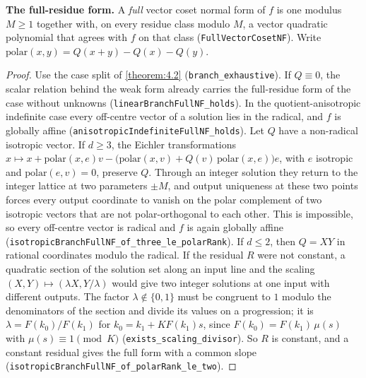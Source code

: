 \textbf{The full-residue form.} A \emph{full} vector coset normal form of $f$ is one modulus $M ≥ 1$ together with, on every residue class modulo $M$, a vector quadratic polynomial that agrees with $f$ on that class (\texttt{FullVectorCosetNF}). Write $\mathrm{polar}(x, y) = Q(x + y) - Q(x) - Q(y)$.


\begin{proof}
Use the case split of \cref{theorem:4.2} (\texttt{branch\_exhaustive}). If $Q ≡ 0$, the scalar relation behind the weak form already carries the full-residue form of the case without unknowns (\texttt{linearBranchFullNF\_holds}). In the quotient-anisotropic indefinite case every off-centre vector of a solution lies in the radical, and $f$ is globally affine (\texttt{anisotropicIndefiniteFullNF\_holds}). Let $Q$ have a non-radical isotropic vector. If $d ≥ 3$, the Eichler transformations $x ↦ x + \mathrm{polar}(x, e)v - \big(\mathrm{polar}(x, v) + Q(v)\,\mathrm{polar}(x, e)\big)e$, with $e$ isotropic and $\mathrm{polar}(e, v) = 0$, preserve $Q$. Through an integer solution they return to the integer lattice at two parameters $±M$, and output uniqueness at these two points forces every output coordinate to vanish on the polar complement of two isotropic vectors that are not polar-orthogonal to each other. This is impossible, so every off-centre vector is radical and $f$ is again globally affine (\texttt{isotropicBranchFullNF\_of\_three\_le\_polarRank}). If $d ≤ 2$, then $Q = XY$ in rational coordinates modulo the radical. If the residual $R$ were not constant, a quadratic section of the solution set along an input line and the scaling $(X, Y) ↦ (λX, Y/λ)$ would give two integer solutions at one input with different outputs. The factor $λ ∉ \{0, 1\}$ must be congruent to $1$ modulo the denominators of the section and divide its values on a progression; it is $λ = F(k_{0})/F(k_{1})$ for $k_{0} = k_{1} + K F(k_{1}) s$, since $F(k_{0}) = F(k_{1})\,μ(s)$ with $μ(s) ≡ 1 \pmod{K}$ (\texttt{exists\_scaling\_divisor}). So $R$ is constant, and a constant residual gives the full form with a common slope (\texttt{isotropicBranchFullNF\_of\_polarRank\_le\_two}).
\end{proof}

